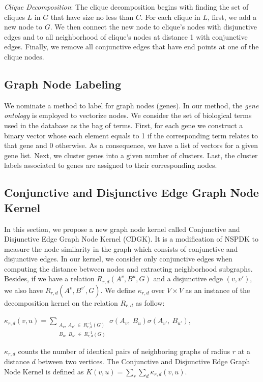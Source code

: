 \documentclass{esannV2}
\begin{document}
\textit{Clique Decomposition}: The clique decomposition begins with finding the set of cliques $L$ in $G$ that have size no less than $C$. For each clique in $L$, first, we add a new node to $G$. We then connect the new node to clique's nodes with disjunctive edges and to all neighborhood of clique's nodes at distance 1 with conjunctive edges. Finally, we remove all conjunctive edges that have end points at one of the clique nodes.
\subsection{Graph Node Labeling}
We nominate a method to label for graph nodes (genes). In our method, the \textit{gene ontology} \cite{ontology} is employed to vectorize nodes. We consider the set of biological terms used in the database as the bag of terms. First, for each gene we construct a binary vector whose each element equals to 1 if the corresponding term relates to that gene and 0 otherwise. As a consequence, we have a list of vectors for a given gene list. Next, we cluster genes into a given number of clusters. Last, the cluster labels associated to genes are assigned to their corresponding nodes.

\subsection{Conjunctive and Disjunctive Edge Graph Node Kernel}
In this section, we propose a new graph node kernel called Conjunctive and Disjunctive Edge Graph Node Kernel (CDGK). It is a modification of NSPDK to measure the node similarity in the graph which consists of conjunctive and disjunctive edges. In our kernel, we consider only conjunctive edges when computing the distance between nodes and extracting neighborhood subgraphs. Besides, if we have a relation $R_{r,d}(A^v, B^u, G)$ and a disjunctive edge $(v, v')$, we also have $R_{r,d}(A^v, B^{v'}, G)$. We define $\kappa_{r,d}$ over $ V \times V$ as an instance of the decomposition kernel on the relation $R_{r,d}$ as follow:
\begin{center}
 $\kappa_{r,d}(v,u) = \sum\limits_{\substack{A_v,\ A_{v'} \ \in \ R_{r,d}^{-1}(G) \\ {B}_{u},\ {B}_{u'} \ \in \ R_{r,d}^{-1}(G) }} { \sigma(A_v,\ B_{u})\sigma(A_{v'},\ B_{u'}) }$,
\end{center}
$\kappa_{r,d}$ counts the number of identical pairs of neighboring graphs of radius $r$ at a distance $d$ between two vertices. The Conjunctive and Disjunctive Edge Graph Node Kernel is defined as $K(v,u) = \sum\limits_{r}{\sum\limits_{d}{\kappa_{r,d}(v,u)}}$.
\end{document}
